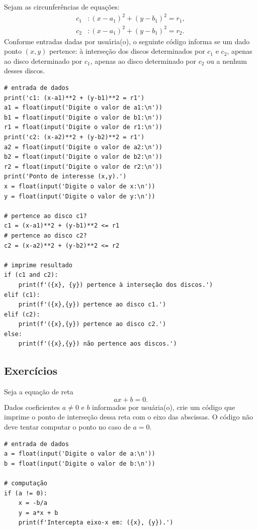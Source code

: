 \begin{ex}
  Sejam as circunferências de equações:
  \begin{align}
    c_1&: (x-a_1)^2 + (y-b_1)^2 = r_1,\\
    c_2&: (x-a_1)^2 + (y-b_1)^2 = r_2.
  \end{align}
  Conforme entradas dadas por usuária(o), o seguinte código informa se um dado ponto $(x, y)$ pertence: à interseção dos discos determinados por $c_1$ e $c_2$, apenas ao disco determinado por $c_1$, apenas ao disco determinado por $c_2$ ou a nenhum desses discos.
\begin{lstlisting}
# entrada de dados
print('c1: (x-a1)**2 + (y-b1)**2 = r1')
a1 = float(input('Digite o valor de a1:\n'))
b1 = float(input('Digite o valor de b1:\n'))
r1 = float(input('Digite o valor de r1:\n'))
print('c2: (x-a2)**2 + (y-b2)**2 = r1')
a2 = float(input('Digite o valor de a2:\n'))
b2 = float(input('Digite o valor de b2:\n'))
r2 = float(input('Digite o valor de r2:\n'))
print('Ponto de interesse (x,y).')
x = float(input('Digite o valor de x:\n'))
y = float(input('Digite o valor de y:\n'))

# pertence ao disco c1?
c1 = (x-a1)**2 + (y-b1)**2 <= r1
# pertence ao disco c2?
c2 = (x-a2)**2 + (y-b2)**2 <= r2

# imprime resultado
if (c1 and c2):
    print(f'({x}, {y}) pertence à interseção dos discos.')
elif (c1):
    print(f'({x},{y}) pertence ao disco c1.')
elif (c2):
    print(f'({x},{y}) pertence ao disco c2.')
else:
    print(f'({x},{y}) não pertence aos discos.')
\end{lstlisting}
\end{ex}


\subsection{Exercícios}

\begin{exer}
  Seja a equação de reta
  \begin{equation}
    ax + b = 0.
  \end{equation}
  Dados coeficientes $a \neq 0$ e $b$ informados por usuária(o), crie um código que imprime o ponto de interseção dessa reta com o eixo das abscissas. O código não deve tentar computar o ponto no caso de $a=0$. 
\end{exer}
\begin{resp}
\begin{lstlisting}
# entrada de dados
a = float(input('Digite o valor de a:\n'))
b = float(input('Digite o valor de b:\n'))

# computação
if (a != 0):
    x = -b/a
    y = a*x + b
    print(f'Intercepta eixo-x em: ({x}, {y}).')
\end{lstlisting}
\end{resp}


